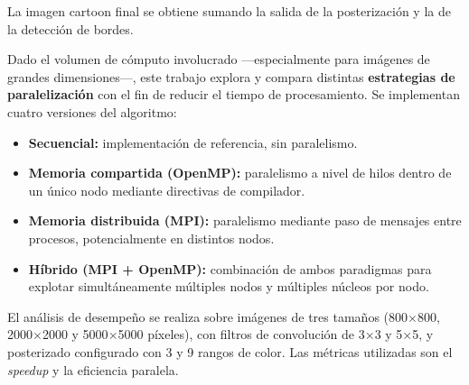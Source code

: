 La imagen cartoon final se obtiene sumando la salida de la posterización y la de la detección
de bordes.
 
Dado el volumen de cómputo involucrado ---especialmente para imágenes de grandes
dimensiones---, este trabajo explora y compara distintas \textbf{estrategias de
paralelización} con el fin de reducir el tiempo de procesamiento. Se implementan cuatro
versiones del algoritmo:
 
\begin{itemize}
  \item \textbf{Secuencial:} implementación de referencia, sin paralelismo.
  \item \textbf{Memoria compartida (OpenMP):} paralelismo a nivel de hilos dentro de un
        único nodo mediante directivas de compilador.
  \item \textbf{Memoria distribuida (MPI):} paralelismo mediante paso de mensajes entre
        procesos, potencialmente en distintos nodos.
  \item \textbf{Híbrido (MPI + OpenMP):} combinación de ambos paradigmas para explotar
        simultáneamente múltiples nodos y múltiples núcleos por nodo.
\end{itemize}
 
El análisis de desempeño se realiza sobre imágenes de tres tamaños
(800$\times$800, 2000$\times$2000 y 5000$\times$5000 píxeles), con filtros de convolución
de 3$\times$3 y 5$\times$5, y posterizado configurado con 3 y 9 rangos de color. Las métricas
utilizadas son el \textit{speedup} y la eficiencia paralela.